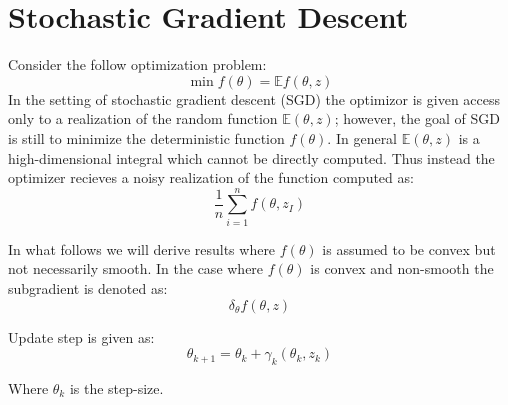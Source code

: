 \section{Stochastic Gradient Descent}
Consider the follow optimization problem:
\begin{equation}
	\min f(\theta) = \mathbb{E}f(\theta, z)
\end{equation}
In the setting of stochastic gradient descent (SGD) the optimizor is given access only to a realization of the random function $\mathbb{E} (\theta, z)$; however, the goal of SGD is still to minimize the deterministic function $f(\theta)$. 
In general $\mathbb{E}(\theta, z)$ is a high-dimensional integral which cannot be directly computed. Thus instead the optimizer recieves a noisy realization of the function computed as:
\begin{equation}
	\frac{1}{n}\sum_{i=1}^{n} f(\theta, z_I)
\end{equation}

In what follows we will derive results where $f(\theta)$ is assumed to be convex but not necessarily smooth. In the case where $f(\theta)$ is convex and non-smooth the subgradient is denoted as: 
\begin{equation}
\delta_{\theta} f (\theta,z)
\end{equation}


Update step is given as: 
\begin{equation}
	\theta_{k+1} = \theta_k + \gamma_k \left(\theta_k, z_k\right)
\end{equation}

Where $\theta_k$ is the step-size. 
